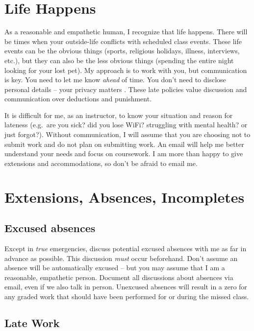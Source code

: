 \documentclass[
]{book}
\begin{document}
\section{Life Happens}\label{life-happens}

As a reasonable and empathetic human, I recognize that life happens. There will be times when your outside-life conflicts with scheduled class events. These life events can be the obvious things (sports, religious holidays, illness, interviews, etc.), but they can also be the less obvious things (spending the entire night looking for your lost pet). My approach is to work with you, but communication is key. You need to let me know \emph{ahead} of time. You don't need to disclose personal details -- your privacy matters
. These late policies value discussion and communication over deductions and punishment.

It is difficult for me, as an instructor, to know your situation and reason for lateness (e.g.~are you sick? did you lose WiFi? struggling with mental health? or just forgot?). Without communication, I will assume that you are choosing not to submit work and do not plan on submitting work. An email will help me better understand your needs and focus on coursework. I am more than happy to give extensions and accommodations, so don't be afraid to email me.

\section{Extensions, Absences, Incompletes}\label{extensions-absences-incompletes}

\subsection{Excused absences}\label{excused-absences}

Except in \emph{true} emergencies, discuss potential excused absences with me as far in advance as possible. This discussion \emph{must} occur beforehand. Don't assume an absence will be automatically excused -- but you may assume that I am a reasonable, empathetic person. Document all discussions about absences via email, even if we also talk in person. Unexcused absences will result in a zero for any graded work that should have been performed for or during the missed class.

\subsection{Late Work}\label{late-work}
\end{document}
